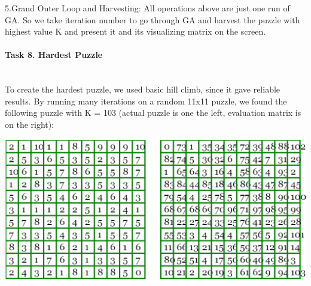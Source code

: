 \documentclass[12pt, letterpaper]{article}
\begin{document}
	5.Grand Outer Loop and Harvesting: All operations above are just one run of GA. So we take iteration number to go through GA and harvest the puzzle with highest value K and present it and its visualizing matrix on the screen.\\

\pagebreak
\paragraph{Task 8. Hardest Puzzle} \mbox{}\\

To create the hardest puzzle, we used basic hill climb, since it gave reliable results. By running many iterations on a random 11x11 puzzle, we found the following puzzle with K = 103 (actual puzzle is one the left, evaluation matrix is on the right):

\includegraphics[width=\linewidth]{"Task 8/Hardest Puzzle"}
\end{document}
